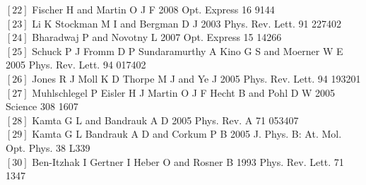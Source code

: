 \documentclass[%
reprint,
twocolumn,
 amsmath,amssymb,
 aps,
pra,
 showpacs
]{revtex4-1}
\begin{document}
\begin{thebibliography}{100}
$[22]$ Fischer H and Martin O J F 2008 Opt. Express 16 9144\\
$[23]$ Li K Stockman M I and Bergman D J 2003 Phys. Rev. Lett. 91 227402\\
$[24]$ Bharadwaj P and Novotny L 2007 Opt. Express 15 14266\\
$[25]$ Schuck P J Fromm D P Sundaramurthy A Kino G S and Moerner W E 2005 Phys. Rev. Lett. 94 017402\\
$[26]$ Jones R J Moll K D Thorpe M J and Ye J 2005 Phys. Rev. Lett. 94 193201\\
$[27]$ Muhlschlegel P Eisler H J Martin O J F Hecht B and Pohl D W 2005 Science 308 1607\\
$[28]$ Kamta G L and Bandrauk A D 2005 Phys. Rev. A 71 053407\\
$[29]$ Kamta G L Bandrauk A D and Corkum P B 2005 J. Phys. B: At. Mol. Opt. Phys. 38 L339\\
$[30]$ Ben-Itzhak I Gertner I Heber O and Rosner B 1993 Phys. Rev. Lett. 71 1347\\
\end{thebibliography}
\end{document}
